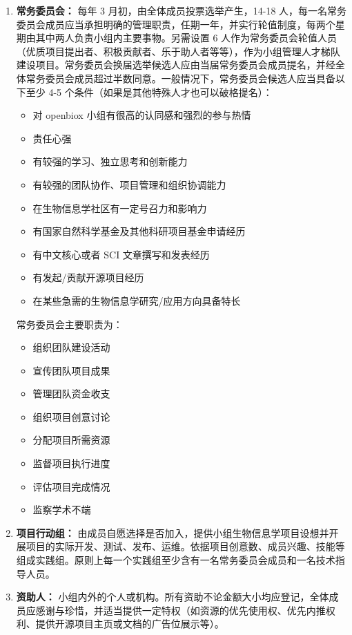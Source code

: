 \documentclass[]{article}
\providecommand{\tightlist}{%
  \setlength{\itemsep}{0pt}\setlength{\parskip}{0pt}}
\begin{document}
\begin{enumerate}
\def\labelenumi{\arabic{enumi}.}
\item
  \textbf{常务委员会：} 每年 3 月初，由全体成员投票选举产生，14-18
  人，每一名常务委员会成员应当承担明确的管理职责，任期一年，并实行轮值制度，每两个星期由其中两人负责小组内主要事物。另需设置
  6
  人作为常务委员会轮值人员（优质项目提出者、积极贡献者、乐于助人者等等），作为小组管理人才梯队建设项目。常务委员会换届选举候选人应由当届常务委员会成员提名，并经全体常务委员会成员超过半数同意。一般情况下，常务委员会候选人应当具备以下至少
  4-5 个条件（如果是其他特殊人才也可以破格提名）：

  \begin{itemize}
  \tightlist
  \item
    对 openbiox 小组有很高的认同感和强烈的参与热情
  \item
    责任心强
  \item
    有较强的学习、独立思考和创新能力
  \item
    有较强的团队协作、项目管理和组织协调能力
  \item
    在生物信息学社区有一定号召力和影响力
  \item
    有国家自然科学基金及其他科研项目基金申请经历
  \item
    有中文核心或者 SCI 文章撰写和发表经历
  \item
    有发起/贡献开源项目经历
  \item
    在某些急需的生物信息学研究/应用方向具备特长
  \end{itemize}

  常务委员会主要职责为：

  \begin{itemize}
  \tightlist
  \item
    组织团队建设活动
  \item
    宣传团队项目成果
  \item
    管理团队资金收支
  \item
    组织项目创意讨论
  \item
    分配项目所需资源
  \item
    监督项目执行进度
  \item
    评估项目完成情况
  \item
    监察学术不端
  \end{itemize}
\item
  \textbf{项目行动组：}
  由成员自愿选择是否加入，提供小组生物信息学项目设想并开展项目的实际开发、测试、发布、运维。依据项目创意数、成员兴趣、技能等组成实践组。原则上每一个实践组至少含有一名常务委员会成员和一名技术指导人员。
\item
  \textbf{资助人：}
  小组内外的个人或机构。所有资助不论金额大小均应登记，全体成员应感谢与珍惜，并适当提供一定特权（如资源的优先使用权、优先内推权利、提供开源项目主页或文档的广告位展示等）。
\end{enumerate}
\end{document}

